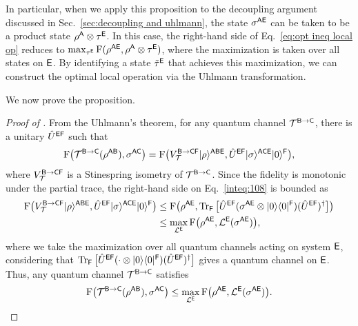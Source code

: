 In particular, when we apply this proposition to the decoupling argument discussed in Sec.~\ref{sec:decoupling and uhlmann}, the state $\sigma^{\sA\sE}$ can be taken to be a product state $\rho^\sA \otimes \tau^\sE$. In this case, the right-hand side of Eq.~\eqref{eq:opt ineq local op} reduces to
$\max_{\tau^\sE}\rF(\rho^{\sA\sE}, \rho^\sA\otimes\tau^\sE)$, where the maximization is taken over all states on $\sE$.
By identifying a state $\til{\tau}^\sE$ that achieves this maximization, we can construct the optimal local operation via the Uhlmann transformation.

We now prove the proposition.


\begin{proof}[Proof of ]
    


From the Uhlmann's theorem, for any quantum channel $\cT^{\sB\rarr\sC}$, there is a unitary $\hat{U}^{\sE\sF}$ such that
\begin{align}
\label{inteq:108}
    \rF\big(\cT^{\sB\rarr\sC}(\rho^{\sA\sB}), \sigma^{\sA\sC}\big) = \rF\big(V_\cT^{\sB\rarr\sC\sF}\ket{\rho}^{\sA\sB\sE}, \hat{U}^{\sE\sF}\ket{\sigma}^{\sA\sC\sE}\ket{0}^\sF\big),
\end{align}
where $V_\cT^{\sB\rarr\sC\sF}$ is a Stinespring isometry of $\cT^{\sB\rarr\sC}$.
Since the fidelity is monotonic under the partial trace, the right-hand side on Eq.~\eqref{inteq:108} is bounded as
\begin{align}
    \rF\big(V_\cT^{\sB\rarr\sC\sF}\ket{\rho}^{\sA\sB\sE}, \hat{U}^{\sE\sF}\ket{\sigma}^{\sA\sC\sE}\ket{0}^\sF\big)
    &\leq \rF\big(\rho^{\sA\sE}, \tr_\sF\big[\hat{U}^{\sE\sF}(\sigma^{\sA\sE}\otimes\ketbra{0}{0}^\sF)(\hat{U}^{\sE\sF})^\dag\big]\big) \\
    &\leq \max_{\cL^{\sE}}\rF\big(\rho^{\sA\sE}, \cL^\sE(\sigma^{\sA\sE})\big), 
\end{align}
where we take the maximization over all quantum channels acting on system $\sE$, considering that $\tr_\sF\big[\hat{U}^{\sE\sF}(\cdot\otimes\ketbra{0}{0}^\sF)(\hat{U}^{\sE\sF})^\dag\big]$ gives a quantum channel on $\sE$.
Thus, any quantum channel $\cT^{\sB\rarr\sC}$ satisfies
\begin{align}
\label{inteq:109}
    \rF\big(\cT^{\sB\rarr\sC}(\rho^{\sA\sB}), \sigma^{\sA\sC}\big)
    \leq \max_{\cL^{\sE}}\rF\big(\rho^{\sA\sE}, \cL^\sE(\sigma^{\sA\sE})\big).
\end{align}


\end{proof}
